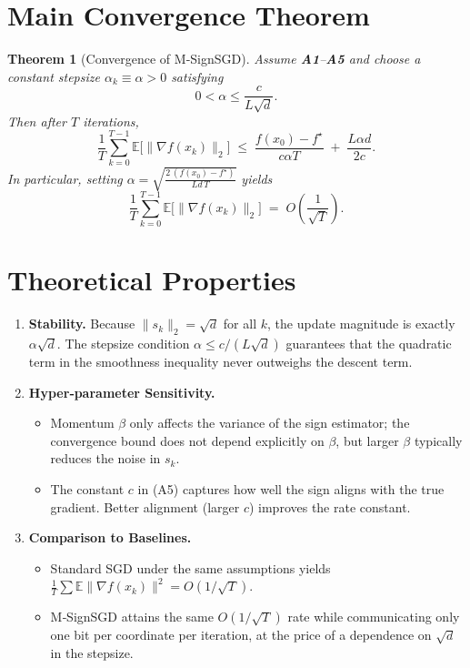 \documentclass{article}
\newtheorem{theorem}{Theorem}
\newcommand{\E}{\mathbb{E}}
\begin{document}
\section*{Main Convergence Theorem}
\begin{theorem}[Convergence of M‑SignSGD]\label{thm:main}
Assume \textbf{A1}–\textbf{A5} and choose a constant stepsize $\alpha_k\equiv\alpha>0$ satisfying
\[
0<\alpha\le \frac{c}{L\sqrt{d}} .
\]
Then after $T$ iterations,
\[
\frac{1}{T}\sum_{k=0}^{T-1}\E\big[\|\nabla f(x_k)\|_{2}\big]
\;\le\;
\frac{f(x_0)-f^\star}{c\alpha T}
\;+\;
\frac{L\alpha d}{2c}.
\tag{1}
\]
In particular, setting $\alpha=\sqrt{\frac{2\,(f(x_0)-f^\star)}{L d\,T}}$ yields
\[
\frac{1}{T}\sum_{k=0}^{T-1}\E\big[\|\nabla f(x_k)\|_{2}\big]
\;=\;O\!\left(\frac{1}{\sqrt{T}}\right).
\]
\end{theorem}

\section*{Theoretical Properties}
\begin{enumerate}[label={P\arabic*.}, leftmargin=*, itemsep=2pt]
\item \textbf{Stability.} Because $\|s_k\|_{2}=\sqrt{d}$ for all $k$, the update magnitude is exactly $\alpha\sqrt{d}$. The stepsize condition $\alpha\le c/(L\sqrt{d})$ guarantees that the quadratic term in the smoothness inequality never outweighs the descent term.

\item \textbf{Hyper‑parameter Sensitivity.}
    \begin{itemize}
        \item Momentum $\beta$ only affects the variance of the sign estimator; the convergence bound does not depend explicitly on $\beta$, but larger $\beta$ typically reduces the noise in $s_k$.
        \item The constant $c$ in (A5) captures how well the sign aligns with the true gradient. Better alignment (larger $c$) improves the rate constant.
    \end{itemize}
\item \textbf{Comparison to Baselines.}
    \begin{itemize}
        \item Standard SGD under the same assumptions yields $\frac{1}{T}\sum\E\|\nabla f(x_k)\|^{2}=O(1/\sqrt{T})$.
        \item M‑SignSGD attains the same $O(1/\sqrt{T})$ rate while communicating only one bit per coordinate per iteration, at the price of a dependence on $\sqrt{d}$ in the stepsize.
    \end{itemize}
\end{enumerate}
\end{document}
